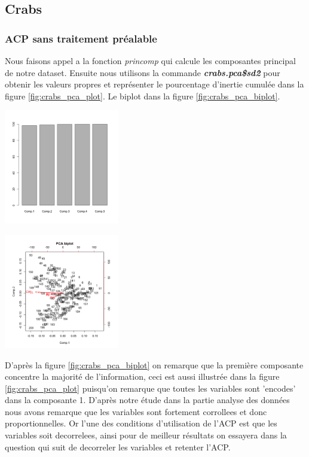 \documentclass[10pt]{article}
\begin{document}
\subsection{Crabs}
\subsubsection{ACP sans traitement préalable}
	Nous faisons appel a la fonction \textit{princomp }qui calcule les composantes principal de notre dataset. Ensuite nous utilisons la commande  \textit{\textbf{crabs.pca\$sd\^2}}   pour obtenir les valeurs propres et représenter le pourcentage d'inertie cumulée dans la figure \ref{fig:crabs_pca_plot}. Le biplot dans la figure \ref{fig:crabs_pca_biplot}.\\
	\begin{minipage}{.5\textwidth}
		\centering
		\includegraphics[width=50mm]{Figures/Crabs/pca_plot.png}
		\label{fig:crabs_pca_plot}
	\end{minipage}%
	\hspace{0.08\linewidth}
	\begin{minipage}{.5\textwidth}
		\centering
		\includegraphics[width=50mm]{Figures/Crabs/pca_biplot.png}
		\label{fig:crabs_pca_biplot}
	\end{minipage}
	\vspace{2mm}
	
	D'après la figure \ref{fig:crabs_pca_biplot} on remarque que la première composante concentre la majorité de l'information, ceci est aussi illustrée dans la figure \ref{fig:crabs_pca_plot} puisqu'on remarque que toutes les variables sont 'encodes' dans la composante 1. D'après notre étude dans la partie analyse des données nous avons remarque que les variables sont fortement corrollees et donc proportionnelles. Or l'une des conditions d'utilisation de l'ACP est que les variables soit decorrelees, ainsi pour de meilleur résultats on essayera dans la question qui suit de decorreler les variables et retenter l'ACP.
	
\end{document}
